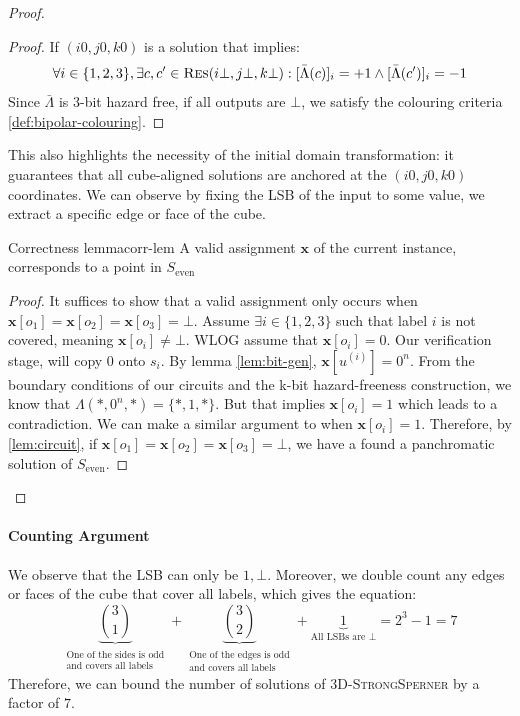 \begin{proof}
\begin{proof}
    If $(i0, j0, k0)$ is a solution that implies:
    $$
    \forall i \in \{1,2,3\}, \exists c,c' \in \textsc{Res}(i\bot, j\bot, k\bot): [\bar{\Lambda}(c)]_i = +1 \wedge [\bar{\Lambda}(c')]_i = -1
    $$
    Since $\bar{\Lambda}$ is 3-bit hazard free, if all outputs are $\bot$, we satisfy the colouring criteria \ref{def:bipolar-colouring}.
\end{proof}
This also highlights the necessity of the initial domain transformation: 
it guarantees that all cube-aligned solutions are anchored at the $(i0, j0,k0)$ coordinates.
We can observe by fixing the LSB of the input to some value,
we extract a specific edge or face of the cube.


\begin{lemmabox}{Correctness lemma}{corr-lem}
    A valid assignment $\mathbf{x}$ of the current instance, corresponds to a point in $S_{\text{even}}$
\end{lemmabox}

\begin{proof}
    It suffices to show that a valid assignment only occurs when $\mathbf{x}[o_1] = \mathbf{x}[o_2] = \mathbf{x}[o_3] = \bot$. Assume
    $\exists i \in \{1,2,3\}$ such that label $i$ is not covered, meaning $\mathbf{x}[o_i] \neq \bot$.
    WLOG assume that $\mathbf{x}[o_i] = 0$. Our verification stage, will copy $0$ onto $s_i$. By lemma \ref{lem:bit-gen}, $\mathbf{x}[u^{(i)}] = 0^n$. From the boundary
    conditions of our circuits and the k-bit hazard-freeness construction,
    we know that $\Lambda(*, 0^n, *) = \{*, 1,  *\}$. But that implies
    $\mathbf{x}[o_i] = 1$ which leads to a contradiction. We can make a similar argument to when $\mathbf{x}[o_i] = 1$.
    Therefore, by \ref{lem:circuit}, if $\mathbf{x}[o_1] = \mathbf{x}[o_2] = \mathbf{x}[o_3] = \bot$, we have a found a panchromatic
    solution of $S_\text{even}$.
\end{proof}

\end{proof}
\paragraph*{Counting Argument}
We observe that the LSB can only be $1,\bot$.
Moreover, we double count any edges or faces of the cube that cover all labels, which gives the equation:
$$
\underbrace{\binom{3}{1}}_{\substack{\text{One of the sides is odd} \\ \text{and covers all labels}}}
+ \underbrace{\binom{3}{2}}_{\substack{\text{One of the edges is odd} \\ \text{and covers all labels}}}
+ \underbrace{1}_{\text{All LSBs are } \bot} = 2^3 - 1 = 7
$$
Therefore, we can bound the number of solutions of \textsc{3D-StrongSperner} by a factor of $7$.


